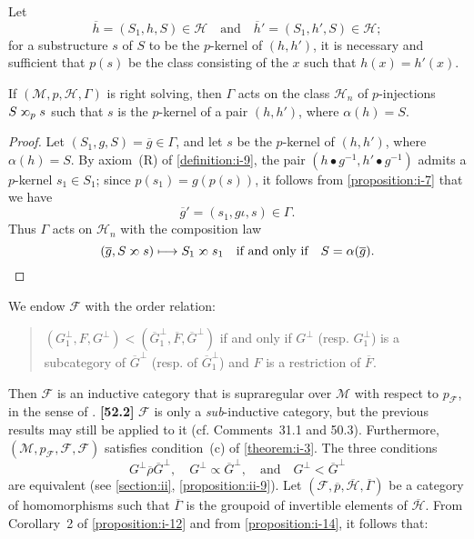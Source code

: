 \documentclass[a4paper,fleqn]{article}
\theoremstyle{plain}
\newenvironment{proposition}[1]
  {\renewcommand\theinnerproposition{#1}\innerproposition}
  {\endinnerproposition}
\theoremstyle{definition}
\newenvironment{longcomm}[1]
  {\noindent\textbf{[#1]}\rmfamily}
  {}
\newcommand{\textand}{\quad\text{and}\quad}
\newcommand{\HH}{\mathcal{H}}
\newcommand{\bHH}{\overline{\HH}}
\newcommand{\MM}{\mathcal{M}}
\newcommand{\FF}{\mathcal{F}}
\newcommand{\relrhobar}{\mathrel{\overline{\rho}}}
\newcommand{\subs}{\mathrel{\propto}}
\newcommand{\sups}{\mathrel{\reflectbox{$\propto$}}}
\newcommand{\smallbullet}{\bullet}
\begin{document}
Let
\[
  \overline{h} = (S_1,h,S)\in\HH
  \textand
  \overline{h}' = (S_1,h',S)\in\HH;
\]
for a substructure $s$ of $S$ to be the $p$-kernel of $(h,h')$, it is necessary and sufficient that $p(s)$ be the class consisting of the $x$ such that $h(x)=h'(x)$.

\begin{proposition}{16}
\label{proposition:i-16}
  If $(\MM,p,\HH,\Gamma)$ is right solving, then $\Gamma$ acts on the class $\HH_n$ of $p$-injections $S\sups_p s$ such that $s$ is the $p$-kernel of a pair $(h,h')$, where $\alpha(h)=S$.
\end{proposition}

\begin{proof}
  Let $(S_1,g,S)=\overline{g}\in\Gamma$, and let $s$ be the $p$-kernel of $(h,h')$, where $\alpha(h)=S$.
  By axiom~(R) of \cref{definition:i-9}, the pair $(h\smallbullet g^{-1},h'\smallbullet g^{-1})$ admits a $p$-kernel $s_1\in S_1$;
  since $p(s_1)=g(p(s))$, it follows from \cref{proposition:i-7} that we have
  \[
    \overline{g}' = (s_1,g\iota,s)
    \in\Gamma.
  \]
  Thus $\Gamma$ acts on $\HH_n$ with the composition law
  \[
    (\overline{g},S\sups s)
    \longmapsto S_1\sups s_1
    \quad\text{if and only if}\quad
    S=\alpha(\overline{g}).
    \qedhere
  \]
\end{proof}

We endow $\FF$ with the order relation:
\begin{quote}
  $(G_1^\perp,F,G^\perp)<(\overline{G}_1^\perp,\overline{F},\overline{G}^\perp)$
  \qquad if and only if\quad
  $G^\perp$ (resp. $G_1^\perp$) is a subcategory of $\overline{G}^\perp$ (resp. of $\overline{G}_1^\perp$) and $F$ is a restriction of $\overline{F}$.
\end{quote}

Then $\FF$ is an inductive category that is supraregular over $\MM$ with respect to $p_\FF$, in the sense of \cite{3c}.
\begin{longcomm}{52.2}
  $\FF$ is only a \emph{sub}-inductive category, but the previous results may still be applied to it (cf. Comments~31.1 and 50.3).
\end{longcomm}
Furthermore, $(\MM,p_\FF,\FF,\FF)$ satisfies condition~(c) of \cref{theorem:i-3}.
The three conditions
\[
  G^\perp\relrhobar\overline{G}^\perp,
  \quad G^\perp\subs\overline{G}^\perp,
  \textand G^\perp<\overline{G}^\perp
\]
are equivalent (see \cref{section:ii}, \cref{proposition:ii-9}).
Let $(\FF,\overline{p},\bHH,\overline{\Gamma})$ be a category of homomorphisms such that $\overline{\Gamma}$ is the groupoid of invertible elements of $\bHH$.
From Corollary~2 of \cref{proposition:i-12} and from \cref{proposition:i-14}, it follows that:
\end{document}
